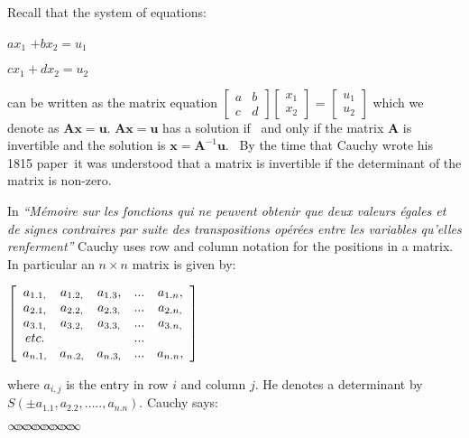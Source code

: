 \documentclass[11pt]{article}%
\theoremstyle{definition}
\newcommand{\sep}{\vspace{-3pt} \begin{center}
{\mathversion{normal}
$\infty \mspace{-5.5mu} \infty \mspace{-5.5mu}
\infty \mspace{-5.5mu} \infty \mspace{-5.5mu}
\infty \mspace{-5.5mu} \infty \mspace{-5.5mu}
\infty \mspace{-5.5mu} \infty$}
\end{center} \vspace{-3pt}}
\begin{document}
Recall that the system of equations:

\begin{center}
$ax_{1}$ $+bx_{2}=u_{1}$

$cx_{1}+dx_{2}=u_{2}$
\end{center}

\noindent can be written as the matrix equation $%
\begin{bmatrix}
a & b\\
c & d
\end{bmatrix}%
\begin{bmatrix}
x_{1}\\
x_{2}%
\end{bmatrix}
$ = $%
\begin{bmatrix}
u_{1}\\
u_{2}%
\end{bmatrix}
$ which we denote as $\mathbf{Ax=u.}$ $\mathbf{Ax=u}$ has a solution if \ and
only if the matrix $\mathbf{A}$ is invertible and the solution is\textbf{
}$\mathbf{x=A}^{-1}\mathbf{u}$. \ By the time that Cauchy wrote his 1815
paper\ it was understood that a matrix is invertible if the determinant of the
matrix is non-zero.

In \textit{\textquotedblleft M\'{e}moire sur les fonctions qui ne peuvent
obtenir que deux valeurs \'{e}gales et de signes contraires par suite des
transpositions op\'{e}r\'{e}es entre les variables qu'elles
renferment\textquotedblright} Cauchy uses row and column notation for the
positions in a matrix. In particular an $n\times n$ matrix is given by:

\begin{center}
$\left[
\begin{array}
[c]{ccccc}%
a_{1.1,} & a_{1.2,} & a_{1.3}, & ... & a_{1.n},\\
a_{2.1,} & a_{2.2,} & a_{2.3,} & ... & a_{2.n,}\\
a_{3.1,} & a_{3.2,} & a_{3.3,} & ... & a_{3.n,}\\
etc. &  &  & ... & \\
a_{n.1,} & a_{n.2,} & a_{n.3,} & ... & a_{n.n},
\end{array}
\right]  $
\end{center}

\noindent where $a_{i,j}$ is the entry in row $i$ and column $j$. He denotes a
determinant by $S(\pm a_{1.1},a_{2.2},\ldots..,a_{n.n})$. Cauchy says:

%

\sep
\end{document}
